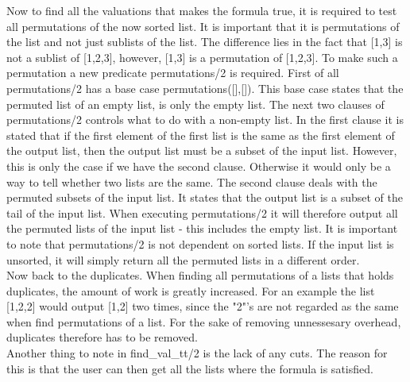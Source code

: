 \documentclass[a4paper,10pt]{article}
\begin{document}
Now to find all the valuations that makes the formula true, it is required to test all permutations of the now sorted list. It is important that it is permutations of the list and not just sublists of the list. The difference lies in the fact that [1,3] is not a sublist of [1,2,3], however, [1,3] is a permutation of [1,2,3]. To make such a permutation a new predicate \textsf{permutations/2} is required. First of all \textsf{permutations/2} has a base case \textsf{permutations([],[]).} This base case states that the permuted list of an empty list, is only the empty list. The next two clauses of \textsf{permutations/2} controls what to do with a non-empty list. In the first clause it is stated that if the first element of the first list is the same as the first element of the output list, then the output list must be a subset of the input list. However, this is only the case if we have the second clause. Otherwise it would only be a way to tell whether two lists are the same. The second clause deals with the permuted subsets of the input list. It states that the output list is a subset of the tail of the input list. When executing \textsf{permutations/2} it will therefore output all the permuted lists of the input list - this includes the empty list. It is important to note that \textsf{permutations/2} is not dependent on sorted lists. If the input list is unsorted, it will simply return all the permuted lists in a different order.\\
Now back to the duplicates. When finding all permutations of a lists that holds duplicates, the amount of work is greatly increased. For an example the list [1,2,2] would output [1,2] two times, since the "2"'s are not regarded as the same when find permutations of a list. For the sake of removing unnessesary overhead, duplicates therefore has to be removed.\\
Another thing to note in \textsf{find\_val\_tt/2} is the lack of any cuts. The reason for this is that the user can then get all the lists where the formula is satisfied.
\end{document}
